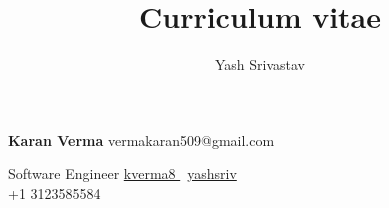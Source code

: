 \documentclass[9pt]{extarticle}
\title{Curriculum vitae}
\author{Yash Srivastav}
\begin{document}

\begingroup
{}

\begin{minipage}[t]{\textwidth}
{\Huge\textbf{\sc Karan Verma}}
\hfill
vermakaran509@gmail.com \faEnvelope


Software Engineer
\hfill
\href{https://github.com/kverma8}{kverma8 \faGithub} \textbar \
\href{https://www.linkedin.com/in/yashsriv/}{yashsriv \faLinkedin} \\
\hfill
+1 3123585584 \faMobile \\
\end{minipage}
% 
\begin{minipage}[t]{0.49\textwidth}
  \vspace{3mm}
  
  
\end{minipage}
\hfill
\begin{minipage}[t]{0.49\textwidth}
  \vspace{3mm}
  
  
  
\end{minipage}
% 

\endgroup
\end{document}
